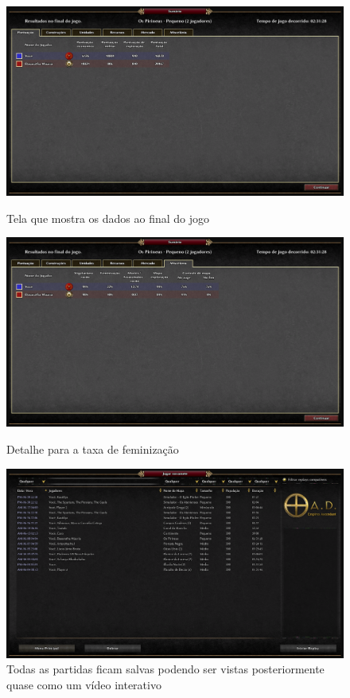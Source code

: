 \documentclass[article,11pt, a4paper,sumario=tradicional]{abntex2}
\begin{document}
	\begin{figure}
		\centering
		\includegraphics[width=0.9\linewidth]{screenshots_0ad/screenshot0012}
		\caption[]{Tela que mostra os dados ao final do jogo}
		\label{fig:screenshot0012}
		
		\includegraphics[width=0.9\linewidth]{screenshots_0ad/screenshot0013}
		\caption{Detalhe para a taxa de feminização}
		\label{fig:screenshot0013}
		
		\includegraphics[width=0.9\linewidth]{screenshots_0ad/screenshot0014}
		\caption[]{Todas as partidas ficam salvas podendo ser vistas posteriormente quase como um vídeo interativo}
		\label{fig:screenshot0014}
		
	\end{figure}
	
\end{document}
